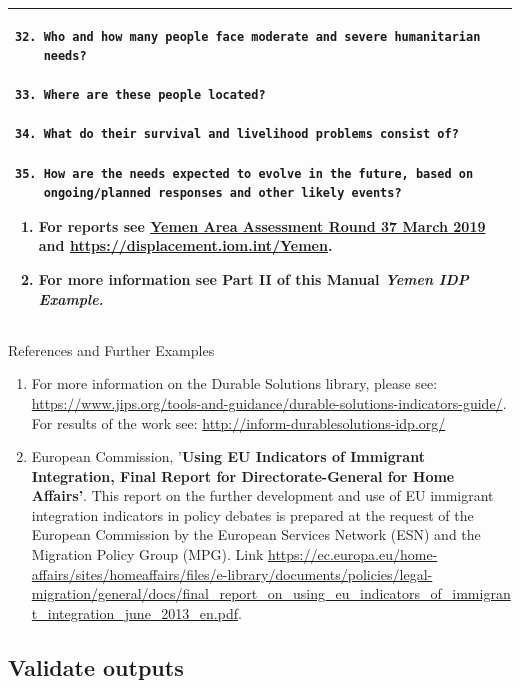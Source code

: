 \documentclass[
]{article}
\begin{document}
\begin{longtable}[]{@{}l@{}}
\begin{minipage}[t]{0.97\columnwidth}
\begin{verbatim}
32. Who and how many people face moderate and severe humanitarian
    needs?

33. Where are these people located?

34. What do their survival and livelihood problems consist of?

35. How are the needs expected to evolve in the future, based on
    ongoing/planned responses and other likely events?
\end{verbatim}

\begin{enumerate}
\def\labelenumi{\arabic{enumi}.}
\setcounter{enumi}{455}
\item
  For reports see \href{https://displacement.iom.int/system/tdf/reports/Yemen\%20Are\%20a\%20Assessment\%20Round\%2037.pdf?file=1\&type=node\&id=5295}{Yemen Area Assessment Round 37 March
  2019}
  and \url{https://displacement.iom.int/Yemen}.
\item
  For more information see Part II of this Manual \emph{Yemen IDP
  Example.}
\end{enumerate}\strut
\end{minipage}\tabularnewline
\bottomrule
\end{longtable}

References and Further Examples

\begin{enumerate}
\def\labelenumi{\arabic{enumi}.}
\setcounter{enumi}{457}
\item
  For more information on the Durable Solutions library, please see:
  \url{https://www.jips.org/tools-and-guidance/durable-solutions-indicators-guide/}.
  For results of the work see:
  \url{http://inform-durablesolutions-idp.org/}
\item
  European Commission, '\textbf{Using EU Indicators of Immigrant
  Integration, Final Report for Directorate-General for Home
  Affairs'}. This report on the further development and use of EU
  immigrant integration indicators in policy debates is prepared at
  the request of the European Commission by the European Services
  Network (ESN) and the Migration Policy Group (MPG). Link
  \url{https://ec.europa.eu/home-affairs/sites/homeaffairs/files/e-library/documents/policies/legal-migration/general/docs/final_report_on_using_eu_indicators_of_immigrant_integration_june_2013_en.pdf}.
\end{enumerate}

\hypertarget{validate-outputs}{%
\subsection{Validate outputs}\label{validate-outputs}}
\end{document}
